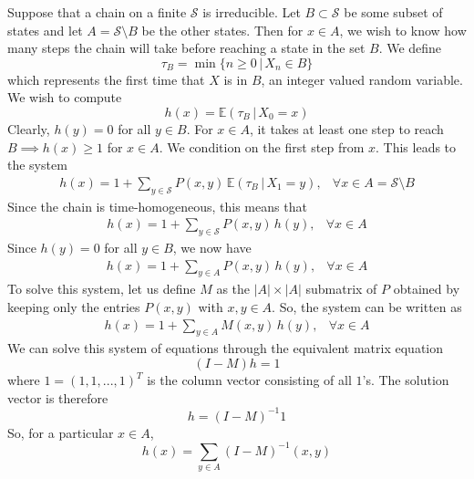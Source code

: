 \documentclass{article}
\begin{document}
      Suppose that a chain on a finite $\mathcal{S}$ is irreducible. Let $B \subset \mathcal{S}$ be some subset of states and let $A = \mathcal{S} \setminus B$ be the other states. Then for $x \in A$, we wish to know how many steps the chain will take before reaching a state in the set $B$. We define 
      \begin{equation}
        \tau_B = \min\{n \geq 0 \,|\, X_n \in B\}
      \end{equation}
      which represents the first time that $X$ is in $B$, an integer valued random variable. We wish to compute
      \begin{equation}
        h(x) = \mathbb{E}(\tau_B \,|\, X_0 = x)
      \end{equation}
      Clearly, $h(y) = 0$ for all $y \in B$. For $x \in A$, it takes at least one step to reach $B \implies h(x) \geq 1$ for $x \in A$. We condition on the first step from $x$. This leads to the system 
      \begin{align*}
        h(x) = 1 + \sum_{y \in \mathcal{S}} P(x, y) \, \mathbb{E}(\tau_B \,|\, X_1 = y), & \forall x \in A = \mathcal{S} \setminus B
      \end{align*}
      Since the chain is time-homogeneous, this means that
      \begin{align*}
        h(x) = 1 + \sum_{y \in \mathcal{S}} P(x, y) \, h(y), & \forall x \in A 
      \end{align*}
      Since $h(y) = 0$ for all $y \in B$, we now have
      \begin{align*}
        h(x) = 1 + \sum_{y \in A} P(x, y) \, h(y), & \forall x \in A 
      \end{align*}
      To solve this system, let us define $M$ as the $|A| \times |A|$ submatrix of $P$ obtained by keeping only the entries $P(x, y)$ with $x, y \in A$. So, the system can be written as
      \begin{align*}
        h(x) = 1 + \sum_{y \in A} M(x, y) \, h(y), & \forall x \in A
      \end{align*}
      We can solve this system of equations through the equivalent matrix equation
      \begin{equation}
        (I - M) h = 1
      \end{equation}
      where $1 = (1, 1, ..., 1)^T$ is the column vector consisting of all $1$'s. The solution vector is therefore
      \begin{equation}
        h = (I - M)^{-1} 1
      \end{equation}
      So, for a particular $x \in A$, 
      \begin{equation}
        h(x) = \sum_{y \in A} (I - M)^{-1} (x, y)
      \end{equation}
\end{document}
